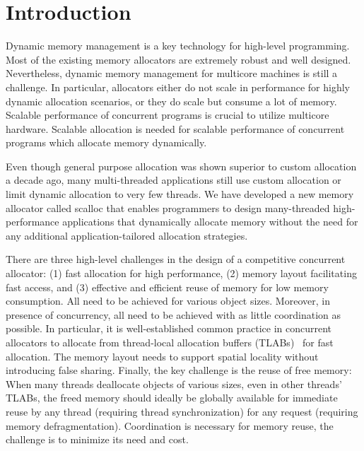 \documentclass[10pt]{sigplanconf}
\begin{document}
\section{Introduction}

Dynamic memory management is a key technology for high-level programming. Most of the existing memory allocators are extremely robust and well designed. Nevertheless, dynamic memory management for multicore machines is still a challenge. In particular, allocators either do not scale in performance for highly dynamic allocation scenarios, or they do scale but consume a lot of memory. Scalable performance of concurrent programs is crucial to utilize multicore hardware. Scalable allocation is needed for scalable performance of concurrent programs which allocate memory dynamically. 

Even though general purpose allocation was shown superior to custom allocation~\cite{Berger:OOPSLA02} a decade ago, many multi-threaded applications still use custom allocation or limit dynamic allocation to very few threads. We have developed a new memory allocator called scalloc that enables programmers to design many-threaded high-performance applications that dynamically allocate memory without the need for any additional application-tailored allocation strategies.

There are three high-level challenges in the design of a competitive concurrent allocator: (1) fast allocation for high performance, (2) memory layout facilitating fast access, and (3) effective and efficient reuse of memory for low memory consumption. All need to be achieved for various object sizes. Moreover, in presence of concurrency, all need to be achieved with as little coordination as possible. In particular, it is well-established common practice in concurrent allocators to allocate from thread-local allocation buffers (TLABs)~\cite{Berger:ASPLOS00} for fast allocation. The memory layout needs to support spatial locality without introducing false sharing. Finally, the key challenge is the reuse of free memory: When many threads deallocate objects of various sizes, even in other threads' TLABs, the freed memory should ideally be globally available for immediate reuse by any thread (requiring thread synchronization) for any request (requiring memory defragmentation). Coordination is necessary for memory reuse, the challenge is to minimize its need and cost.
\end{document}
